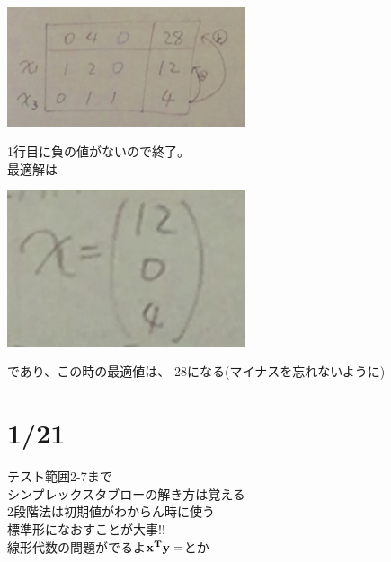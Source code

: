 \documentclass{jsarticle}
\begin{document}
{{{\begin{center}
	\end{center}
	\begin{center}
		\includegraphics[width=7cm]{1_7_16.JPG}
	\end{center}
	1行目に負の値がないので終了。\\
	最適解は
	\begin{center}
		\includegraphics[width=7cm]{1_7_17.JPG}
	\end{center}
	であり、この時の最適値は、-28になる(マイナスを忘れないように)

\section{1/21}
	テスト範囲2-7まで\\
	シンプレックスタブローの解き方は覚える\\
	2段階法は初期値がわからん時に使う\\
	標準形になおすことが大事!!\\
	線形代数の問題がでるよ$\bf{x}^T\bf{y}=$とか
}}}
\end{document}
